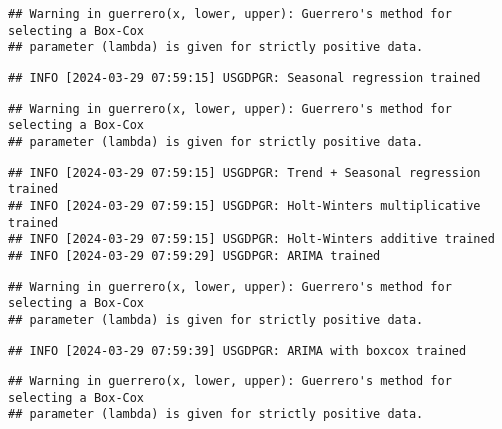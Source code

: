 \documentclass[
]{article}
\begin{document}
\begin{verbatim}
## Warning in guerrero(x, lower, upper): Guerrero's method for selecting a Box-Cox
## parameter (lambda) is given for strictly positive data.
\end{verbatim}

\begin{verbatim}
## INFO [2024-03-29 07:59:15] USGDPGR: Seasonal regression trained
\end{verbatim}

\begin{verbatim}
## Warning in guerrero(x, lower, upper): Guerrero's method for selecting a Box-Cox
## parameter (lambda) is given for strictly positive data.
\end{verbatim}

\begin{verbatim}
## INFO [2024-03-29 07:59:15] USGDPGR: Trend + Seasonal regression trained
## INFO [2024-03-29 07:59:15] USGDPGR: Holt-Winters multiplicative trained
## INFO [2024-03-29 07:59:15] USGDPGR: Holt-Winters additive trained
## INFO [2024-03-29 07:59:29] USGDPGR: ARIMA trained
\end{verbatim}

\begin{verbatim}
## Warning in guerrero(x, lower, upper): Guerrero's method for selecting a Box-Cox
## parameter (lambda) is given for strictly positive data.
\end{verbatim}

\begin{verbatim}
## INFO [2024-03-29 07:59:39] USGDPGR: ARIMA with boxcox trained
\end{verbatim}

\begin{verbatim}
## Warning in guerrero(x, lower, upper): Guerrero's method for selecting a Box-Cox
## parameter (lambda) is given for strictly positive data.
\end{verbatim}
\end{document}
